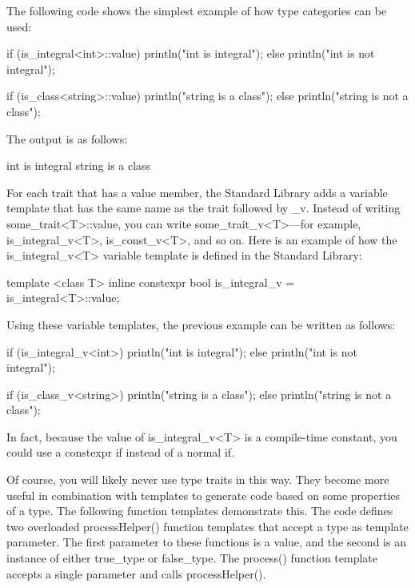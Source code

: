 The following code shows the simplest example of how type categories can be used:

\begin{cpp}
if (is_integral<int>::value) { println("int is integral"); }
else { println("int is not integral"); }

if (is_class<string>::value) { println("string is a class"); }
else { println("string is not a class"); }
\end{cpp}

The output is as follows:

\begin{shell}
int is integral
string is a class
\end{shell}

For each trait that has a value member, the Standard Library adds a variable template that has the same name as the trait followed by \_v. Instead of writing some\_trait<T>::value, you can write some\_trait\_v<T>—for example, is\_integral\_v<T>, is\_const\_v<T>, and so on. Here is an example of how the is\_integral\_v<T> variable template is defined in the Standard Library:

\begin{cpp}
template <class T>
inline constexpr bool is_integral_v = is_integral<T>::value;
\end{cpp}

Using these variable templates, the previous example can be written as follows:

\begin{cpp}
if (is_integral_v<int>) { println("int is integral"); }
else { println("int is not integral"); }

if (is_class_v<string>) { println("string is a class"); }
else { println("string is not a class"); }
\end{cpp}

In fact, because the value of is\_integral\_v<T> is a compile-time constant, you could use a constexpr if instead of a normal if.

Of course, you will likely never use type traits in this way. They become more useful in combination with templates to generate code based on some properties of a type. The following function templates demonstrate this. The code defines two overloaded processHelper() function templates that accept a type as template parameter. The first parameter to these functions is a value, and the second is an instance of either true\_type or false\_type. The process() function template accepts a single parameter and calls processHelper().

